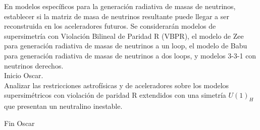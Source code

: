 En modelos específicos para la generación radiativa de masas de neutrinos, establecer si la matriz de masa de neutrinos resultante puede llegar a ser reconstruida en los aceleradores futuros. Se considerarán modelos de supersimetría con Violación Bilineal de Paridad R (VBPR), el modelo de Zee para generación radiativa de masas
de neutrinos a un loop, el modelo de Babu para generación radiativa de
masas de neutrinos a dos loops, y modelos 3-3-1 con neutrinos
derechos.
\vspace{4cm}
\\
Inicio Oscar.\\
Analizar las restricciones astrofísicas y de aceleradores sobre los modelos supersimétricos 
con violación de paridad R extendidos con una simetría $U(1)_H$ que presentan un neutralino inestable.

Fin Oscar



